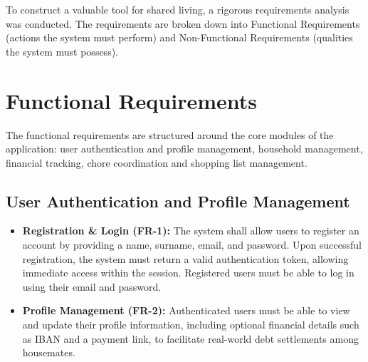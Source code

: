 To construct a valuable tool for shared living, a rigorous requirements analysis was conducted. The requirements are broken down into Functional Requirements (actions the system must perform) and Non-Functional Requirements (qualities the system must possess).

\section{Functional Requirements}
The functional requirements are structured around the core modules of the application: user authentication and profile management, household management, financial tracking, chore coordination and shopping list management.

\subsection{User Authentication and Profile Management}
\begin{itemize}
    \item \textbf{Registration \& Login (FR-1):} The system shall allow users to register an account by providing a name, surname, email, and password. Upon successful registration, the system must return a valid authentication token, allowing immediate access within the session. Registered users must be able to log in using their email and password.
    \item \textbf{Profile Management (FR-2):} Authenticated users must be able to view and update their profile information, including optional financial details such as IBAN and a payment link, to facilitate real-world debt settlements among housemates.
\end{itemize}

